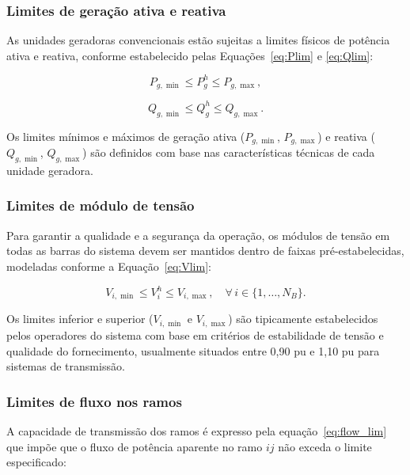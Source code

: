 \documentclass[conference]{IEEEtran}
\begin{document}
\subsubsection{Limites de geração ativa e reativa}

As unidades geradoras convencionais estão sujeitas a limites físicos de potência ativa e reativa, conforme estabelecido pelas Equações~\eqref{eq:Plim} e \eqref{eq:Qlim}:

\begin{equation}
P_{g,\min} \leq P_{g}^{h} \leq P_{g,\max},
\label{eq:Plim}
\end{equation}

\begin{equation}
Q_{g,\min} \leq Q_{g}^{h} \leq Q_{g,\max}.
\label{eq:Qlim}
\end{equation}

\noindent Os limites mínimos e máximos de geração ativa ($P_{g,\min}$, $P_{g,\max}$) e reativa ($Q_{g,\min}$, $Q_{g,\max}$) são definidos com base nas características técnicas de cada unidade geradora.

\subsubsection{Limites de módulo de tensão}

Para garantir a qualidade e a segurança da operação, os módulos de tensão em todas as barras do sistema devem ser mantidos dentro de faixas pré-estabelecidas, modeladas conforme a Equação~\eqref{eq:Vlim}:

\begin{equation}
V_{i,\min} \leq V_{i}^{h} \leq V_{i,\max},
\quad \forall\, i \in \{1, \ldots, N_B\}.
\label{eq:Vlim}
\end{equation}

\noindent Os limites inferior e superior ($V_{i,\min}$ e $V_{i,\max}$) são tipicamente estabelecidos pelos operadores do sistema com base em critérios de estabilidade de tensão e qualidade do fornecimento, usualmente situados entre 0,90 pu e 1,10 pu para sistemas de transmissão.

\subsubsection{Limites de fluxo nos ramos}

A capacidade de transmissão dos ramos é expresso pela equação~\eqref{eq:flow_lim} que impõe que o fluxo de potência aparente no ramo $ij$ não exceda o limite especificado:
\end{document}
